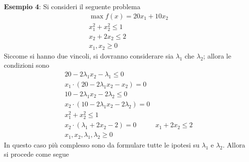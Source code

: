 \documentclass[a4paper]{extarticle}
\begin{document}
\vspace{2em}
\noindent
\textbf{Esempio 4}: Si consideri il seguente problema
\begin{align*}
    &\max f(x) = 20 x_1 + 10x_2\\
    &x_1^2 + x_2^2 \leq 1\\
    &x_2 + 2x_2 \leq 2\\
    &x_1, x_2 \geq 0
\end{align*}
Siccome si hanno due vincoli, si dovranno considerare sia $\lambda_1$ che $\lambda_2$; allora le condizioni sono
\begin{align}
    & 20 - 2 \lambda_1 x_2 - \lambda_1 \leq 0\\
    & x_1 \cdot (20 - 2\lambda_1 x_2 - x_2) = 0\\
    & 10 - 2 \lambda_1 x_2 - 2 \lambda_2 \leq 0\\
    & x_2 \cdot (10 - 2 \lambda_1 x_2 - 2 \lambda_2) = 0\\
    & x_1^2+x_2^2 \leq 1\\
    & x_2 \cdot (\lambda_1 + 2x_2 - 2) = 0
    & x_1+2x_2 \leq 2\\
    & x_1,x_2,\lambda_1,\lambda_2 \geq 0
\end{align}
In questo caso più complesso sono da formulare tutte le ipotesi su $\lambda_1$ e $\lambda_2$. Allora si procede come segue
\end{document}
